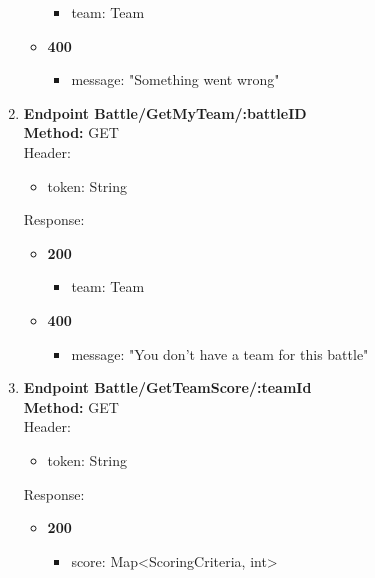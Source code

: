 \begin{enumerate}
\begin{itemize}
        \begin{itemize}
            \item team: Team
        \end{itemize}
        \item \textbf{400} \\
        \begin{itemize}
            \item message: "Something went wrong"
        \end{itemize}
    \end{itemize}
    \item \textbf{Endpoint Battle/GetMyTeam/:battleID} \\
    \textbf{Method:} GET \\
    Header:\\
    \begin{itemize}
        \item token: String
    \end{itemize}
    Response:\\
    \begin{itemize}
        \item \textbf{200} \\
        \begin{itemize}
            \item team: Team
        \end{itemize}
        \item \textbf{400} \\
        \begin{itemize}
            \item message: "You don't have a team for this battle"
        \end{itemize}
    \end{itemize}
    \item \textbf{Endpoint Battle/GetTeamScore/:teamId} \\
    \textbf{Method:} GET \\
    Header:\\
    \begin{itemize}
        \item token: String
    \end{itemize}
    Response:\\
    \begin{itemize}
        \item \textbf{200} \\
        \begin{itemize}
            \item score: Map<ScoringCriteria, int>

\end{itemize}
\end{itemize}
\end{enumerate}
